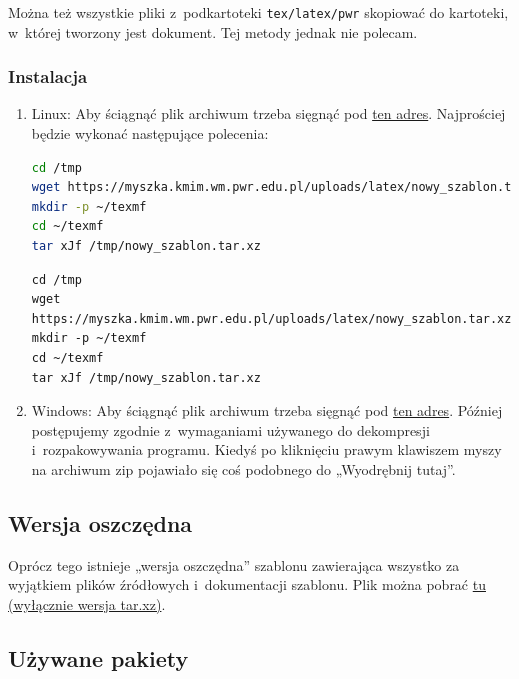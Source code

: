 Można też wszystkie pliki z~podkartoteki \lstinline|tex/latex/pwr| skopiować do kartoteki, w~której tworzony jest dokument. Tej metody jednak nie polecam.

\begin{frame}[fragile]
 \frametitle{Instalacja}
 \begin{enumerate}
  \item Linux: Aby ściągnąć plik archiwum trzeba sięgnąć pod \href{https://myszka.kmim.wm.pwr.edu.pl/uploads/latex/nowy_szablon.tar.xz}{ten adres}. Najprościej będzie wykonać następujące polecenia:
        \ifpdf
         \begin{lstlisting}[language=bash]
cd /tmp
wget https://myszka.kmim.wm.pwr.edu.pl/uploads/latex/nowy_szablon.tar.xz
mkdir -p ~/texmf
cd ~/texmf
tar xJf /tmp/nowy_szablon.tar.xz
\end{lstlisting}
        \else
         \begin{verbatim}
cd /tmp
wget https://myszka.kmim.wm.pwr.edu.pl/uploads/latex/nowy_szablon.tar.xz
mkdir -p ~/texmf
cd ~/texmf
tar xJf /tmp/nowy_szablon.tar.xz
\end{verbatim}
        \fi
  \item Windows: Aby ściągnąć plik archiwum trzeba sięgnąć pod \href{https://myszka.kmim.wm.pwr.edu.pl/uploads/latex/nowy_szablon.zip}{ten adres}. Później postępujemy zgodnie z~wymaganiami używanego do dekompresji i~rozpakowywania programu. Kiedyś po kliknięciu prawym klawiszem myszy na archiwum zip pojawiało się coś podobnego do „Wyodrębnij tutaj”.
 \end{enumerate}
\end{frame}

\subsection{Wersja oszczędna}

Oprócz tego istnieje „wersja oszczędna” szablonu zawierająca wszystko za wyjątkiem plików źródłowych i~dokumentacji szablonu. Plik można pobrać \href{https://myszka.kmim.wm.pwr.edu.pl/uploads/latex/nowy_szablon_maly.tar.xz}{tu (wyłącznie wersja tar.xz)}.

\subsection{Używane pakiety}

